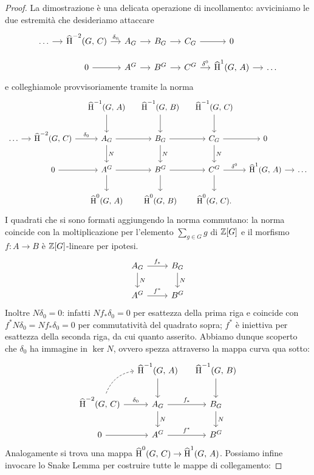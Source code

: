 \begin{proof}
	La dimostrazione è una delicata operazione di incollamento: avviciniamo le due estremità che desideriamo attaccare
	\[\begin{tikzcd}[column sep = small, row sep = small]
	\dots \rar
	& \Hh^{-2}(G, \, C) \rar["\delta_0"]
	& A_G \rar
	& B_G \rar
	& C_G \rar
	& 0 & \\
	& 0 \rar
	&A^G \rar
	& B^G \rar
	& C^G \rar["\delta^0"]
	& \Hh^1(G, \, A) \rar
	& \dots \end{tikzcd}\]
	e colleghiamole provvisoriamente tramite la norma
	\[\begin{tikzcd}[column sep = small]
	&& \Hh^{-1}(G, \, A) \dar 
	& \Hh^{-1}(G, \, B) \dar 
	& \Hh^{-1}(G, \, C) \dar
	&& \\
	\dots \rar
	& \Hh^{-2}(G, \, C) \rar["\delta_0"]
	& A_G \rar \dar{N} 
	& B_G \rar \dar{N}
	& C_G \rar \dar{N}
	& 0 & \\
	& 0 \rar
	&A^G \rar\dar
	& B^G \rar\dar
	& C^G \rar["\delta^0"]\dar
	& \Hh^1(G, \, A) \rar
	& \dots \\
	&& \Hh^{0}(G, \, A) 
	& \Hh^{0}(G, \, B)  
	& \Hh^{0}(G, \, C).
	&&
	\end{tikzcd}\]
	I quadrati che si sono formati aggiungendo la norma commutano: la norma coincide con la moltiplicazione per l'elemento $ \sum_{g \in G} g $ di $ \mathbb{Z}[G] $ e il morfismo $ f \colon A \to B $ è $ \mathbb{Z}[G] $-lineare per ipotesi.
	\[\begin{tikzcd}
	A_G \rar["f_*"] \dar{N} 
	& B_G \arrow[d, "N"]\\
	A^G \rar["f^*"]
	& B^G
	\end{tikzcd}\]
	Inoltre $ N\delta_0 = 0 $: infatti $ Nf_*\delta_0 = 0 $ per esattezza della prima riga e coincide con $ f^*N\delta_0 = Nf_*\delta_0 = 0 $ per commutatività del quadrato sopra; $ f^* $ è iniettiva per esattezza della seconda riga, da cui quanto asserito. Abbiamo dunque scoperto che $ \delta_0 $ ha immagine in $ \ker N $, ovvero spezza attraverso la mappa curva qua sotto:
	\[\begin{tikzcd}[column sep = small]
	& \Hh^{-1}(G, \, A) \dar
	& \Hh^{-1}(G, \, B) \dar \\
	\Hh^{-2}(G, \, C) \rar["\delta_0"] \arrow[ur, dashed, bend left = 30]
	& A_G \rar["f_*"] \dar{N} 
	& B_G \arrow[d, "N"]\\
	0 \rar
	&A^G \rar["f^*"]
	& B^G
	\end{tikzcd}\]
	Analogamente si trova una mappa $ \operatorname{\widehat{H}}^0(G, \, C) \to \operatorname{\widehat{H}}^1(G, \, A) $. Possiamo infine invocare lo Snake Lemma per costruire tutte le mappe di collegamento:

\end{proof}
